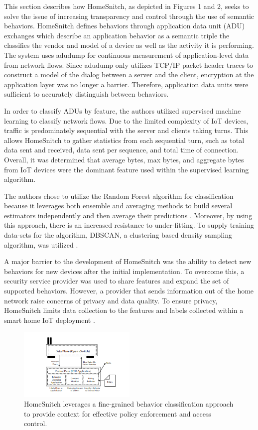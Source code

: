 This section describes how HomeSnitch, as depicted in Figures 1 and 2, seeks to solve the issue of increasing transparency and control through the use of semantic behaviors. HomeSnitch defines behaviors through application data unit (ADU) exchanges which describe an application behavior as a semantic triple the classifies the vendor and model of a device as well as the activity it is performing. The system uses adudump \cite{Jeff} for continuous measurement of application-level data from network flows. Since adudump only utilizes TCP/IP packet header traces to construct a model of the dialog between a server and the client, encryption at the application layer was no longer a barrier. Therefore, application data units were sufficient to accurately distinguish between behaviors. 

In order to classify ADUs by feature, the authors utilized supervised machine learning to classify network flows. Due to the limited complexity of IoT devices, traffic is predominately sequential with the server and clients taking turns. This allows HomeSnitch to gather statistics from each sequential turn, such as total data sent and received, data sent per sequence, and total time of connection. Overall, it was determined that average bytes, max bytes, and aggregate bytes from IoT devices were the dominant feature used within the supervised learning algorithm. 

The authors chose to utilize the Random Forest algorithm for classification because it leverages both ensemble and averaging methods to build several estimators independently and then average their predictions \cite{Fabian}. Moreover, by using this approach, there is an increased resistance to under-fitting. To supply training data-sets for the algorithm, DBSCAN, a clustering based density sampling algorithm, was utilized \cite{Martin, Fabian}.

A major barrier to the development of HomeSnitch was the ability to detect new behaviors for new devices after the initial implementation. To overcome this, a security service provider was used to share features and expand the set of supported behaviors. However, a provider that sends information out of the home network raise concerns of privacy and data quality. To ensure privacy, HomeSnitch limits data collection to the features and labels collected within a smart home IoT deployment \cite{Enck}. 

\begin{figure}[h]
\centering
\includegraphics[width=0.5\textwidth]{Figure 2.PNG}
\caption{HomeSnitch leverages a fine-grained behavior
classification approach to provide context for effective policy enforcement and access control. \cite{Enck}}
\label{fig:example}
\end{figure}

